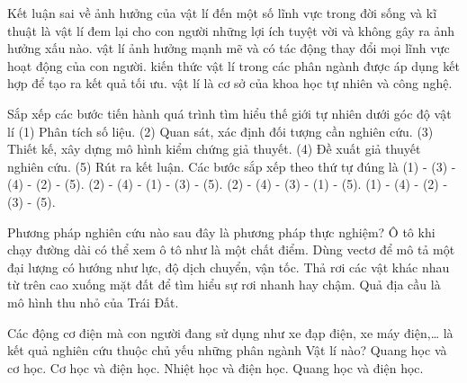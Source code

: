 \begin{ex}
Kết luận sai về ảnh hưởng của vật lí đến một số lĩnh vực trong đời sống và kĩ thuật là
\choice
{\True vật lí đem lại cho con người những lợi ích tuyệt vời và không gây ra ảnh hưởng xấu nào.}
{vật lí ảnh hưởng mạnh mẽ và có tác động thay đổi mọi lĩnh vực hoạt động của con người.}
{kiến thức vật lí trong các phân ngành được áp dụng kết hợp để tạo ra kết quả tối ưu.}
{vật lí là cơ sở của khoa học tự nhiên và công nghệ.}
\end{ex}

\begin{ex}
Sắp xếp các bước tiến hành quá trình tìm hiểu thế giới tự nhiên dưới góc độ vật lí 
(1) Phân tích số liệu. 
(2) Quan sát, xác định đối tượng cần nghiên cứu.
(3) Thiết kế, xây dựng mô hình kiểm chứng giả thuyết. 
(4) Đề xuất giả thuyết nghiên cứu.
(5) Rút ra kết luận. 
Các bước sắp xếp theo thứ tự đúng là
\choice
{(1) - (3) - (4) - (2) - (5).}
{(2) - (4) - (1) - (3) - (5).}
{\True (2) - (4) - (3) - (1) - (5).}
{(1) - (4) - (2) - (3) - (5).}
\end{ex}

\begin{ex}
Phương pháp nghiên cứu nào sau đây là phương pháp thực nghiệm?
\choice
{Ô tô khi chạy đường dài có thể xem ô tô như là một chất điểm.}
{Dùng vectơ để mô tả một đại lượng có hướng như lực, độ dịch chuyển, vận tốc.}
{\True Thả rơi các vật khác nhau từ trên cao xuống mặt đất để tìm hiểu sự rơi nhanh hay chậm.}
{Quả địa cầu là mô hình thu nhỏ của Trái Đất.}
\end{ex}

\begin{ex}
Các động cơ điện mà con người đang sử dụng như xe đạp điện, xe máy điện,… là kết quả nghiên cứu thuộc chủ yếu những phân ngành Vật lí nào?
\choice
{Quang học và cơ học.}
{\True Cơ học và điện học.}
{Nhiệt học và điện học.}
{Quang học và điện học.}
\end{ex}

